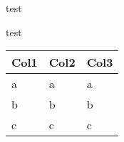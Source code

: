 test

test

\begin{longtable}[]{@{}lll@{}}
\toprule\noalign{}
Col1 & Col2 & Col3 \\
\midrule\noalign{}
\endhead
\bottomrule\noalign{}
\endlastfoot
a & a & a \\
b & b & b \\
c & c & c \\
\end{longtable}
